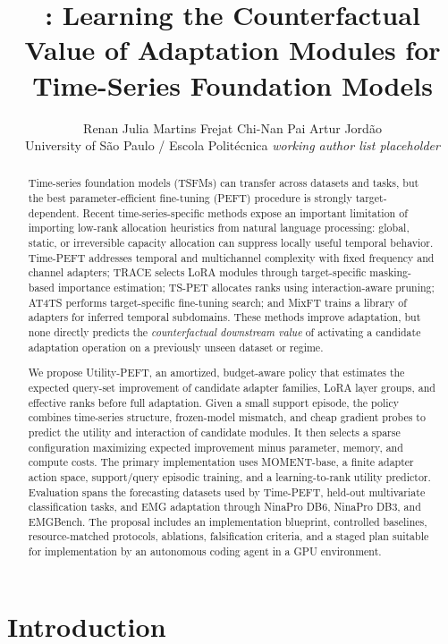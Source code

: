 \documentclass[10pt]{article}
\title{\method: Learning the Counterfactual Value of Adaptation Modules for Time-Series Foundation Models}
\author{Renan \quad Julia Martins Frejat \quad Chi-Nan Pai \quad Artur Jord\~ao\\
University of S\~ao Paulo / Escola Polit\'ecnica \quad \textit{working author list placeholder}}
\newcommand{\method}{Utility-PEFT}
\begin{document}
\maketitle

\begin{abstract}
Time-series foundation models (TSFMs) can transfer across datasets and tasks, but the best parameter-efficient fine-tuning (PEFT) procedure is strongly target-dependent. Recent time-series-specific methods expose an important limitation of importing low-rank allocation heuristics from natural language processing: global, static, or irreversible capacity allocation can suppress locally useful temporal behavior. Time-PEFT addresses temporal and multichannel complexity with fixed frequency and channel adapters; TRACE selects LoRA modules through target-specific masking-based importance estimation; TS-PET allocates ranks using interaction-aware pruning; AT4TS performs target-specific fine-tuning search; and MixFT trains a library of adapters for inferred temporal subdomains. These methods improve adaptation, but none directly predicts the \emph{counterfactual downstream value} of activating a candidate adaptation operation on a previously unseen dataset or regime.

We propose \method, an amortized, budget-aware policy that estimates the expected query-set improvement of candidate adapter families, LoRA layer groups, and effective ranks before full adaptation. Given a small support episode, the policy combines time-series structure, frozen-model mismatch, and cheap gradient probes to predict the utility and interaction of candidate modules. It then selects a sparse configuration maximizing expected improvement minus parameter, memory, and compute costs. The primary implementation uses MOMENT-base, a finite adapter action space, support/query episodic training, and a learning-to-rank utility predictor. Evaluation spans the forecasting datasets used by Time-PEFT, held-out multivariate classification tasks, and EMG adaptation through NinaPro DB6, NinaPro DB3, and EMGBench. The proposal includes an implementation blueprint, controlled baselines, resource-matched protocols, ablations, falsification criteria, and a staged plan suitable for implementation by an autonomous coding agent in a GPU environment.
\end{abstract}

\section{Introduction}
\end{document}
